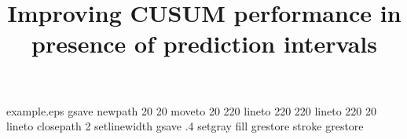 %
%
%
%
%
%
%
%
\begin{filecontents*}{example.eps}
gsave
newpath
  20 20 moveto
  20 220 lineto
  220 220 lineto
  220 20 lineto
closepath
2 setlinewidth
gsave
  .4 setgray fill
grestore
stroke
grestore
\end{filecontents*}
%
\RequirePackage{fix-cm}
%
\documentclass[smallextended]{svjour3}       %
%
\smartqed  %
%
\usepackage{graphicx}
%
%
%
%
%
\usepackage{natbib}
\usepackage{algorithm}%
\usepackage{algpseudocode}%
\usepackage{listings}
\usepackage{hyperref}
\usepackage{array}
\usepackage{amsmath}
\usepackage{amssymb}
\usepackage{tikz}
\usepackage{graphics}
\usepackage{standalone}

	\title{Improving CUSUM performance in presence of prediction intervals}


